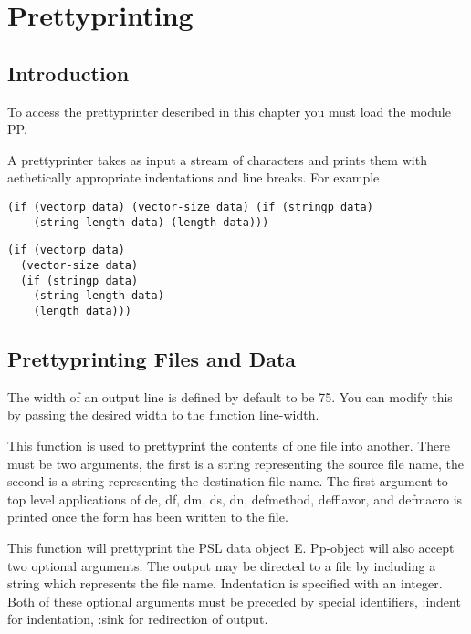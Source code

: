 \chapter{Prettyprinting}

\section{Introduction}

  To access the prettyprinter described in this chapter you must
load the module PP.

  A  prettyprinter  takes  as  input  a stream of characters and
prints them with aethetically appropriate indentations and  line
breaks.  For example

\begin{verbatim}
(if (vectorp data) (vector-size data) (if (stringp data)
    (string-length data) (length data)))
\end{verbatim}
\begin{verbatim}
(if (vectorp data)
  (vector-size data)
  (if (stringp data)
    (string-length data)
    (length data)))
\end{verbatim}
\section{Prettyprinting Files and Data}

  The  width  of  an output line is defined by default to be 75.
You can modify this by passing the desired width to the function
line-width.


{    This function is used to prettyprint the contents of one
    file  into  another.  There must be two arguments, the first
    is a string representing the source file name, the second is
    a string representing the destination file name.  The  first
    argument  to  top  level applications of de, df, dm, ds, dn,
    defmethod, defflavor, and defmacro is printed once the  form
    has been written to the file.
}

{    This  function  will  prettyprint  the  PSL  data  object E.
    Pp-object will also accept  two  optional  arguments.    The
    output may be directed to a file by including a string which
    represents  the file name.  Indentation is specified with an
    integer.  Both of these optional arguments must be  preceded
    by  special  identifiers, :indent for indentation, :sink for
    redirection of output.
}
